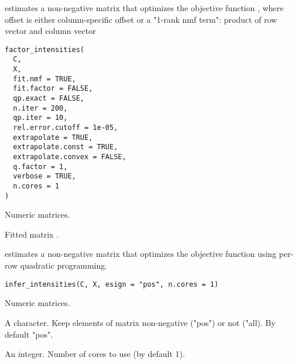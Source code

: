 \documentclass[letterpaper]{book}
\begin{document}
%
\begin{Description}\relax
{} estimates a non-negative matrix  that optimizes the objective function ,
where offset is either column-specific offset or a "1-rank nmf term": product of row vector and column vector
\end{Description}
%
\begin{Usage}
\begin{verbatim}
factor_intensities(
  C,
  X,
  fit.nmf = TRUE,
  fit.factor = FALSE,
  qp.exact = FALSE,
  n.iter = 200,
  qp.iter = 10,
  rel.error.cutoff = 1e-05,
  extrapolate = TRUE,
  extrapolate.const = TRUE,
  extrapolate.convex = FALSE,
  q.factor = 1,
  verbose = TRUE,
  n.cores = 1
)
\end{verbatim}
\end{Usage}
%
\begin{Arguments}
\begin{ldescription}
\item[\code{C, X}] Numeric matrices.
\end{ldescription}
\end{Arguments}
%
\begin{Value}
Fitted matrix .
\end{Value}
%
\begin{Description}\relax
{} estimates a non-negative matrix  that optimizes the objective function 
using per-row quadratic programming.
\end{Description}
%
\begin{Usage}
\begin{verbatim}
infer_intensities(C, X, esign = "pos", n.cores = 1)
\end{verbatim}
\end{Usage}
%
\begin{Arguments}
\begin{ldescription}
\item[\code{C, X}] Numeric matrices.

\item[\code{esign}] A character. Keep elements of matrix  non-negative ("pos") or not ("all). By default "pos".

\item[\code{n.cores}] An integer. Number of cores to use (by default 1).
\end{ldescription}
\end{Arguments}
\end{document}

